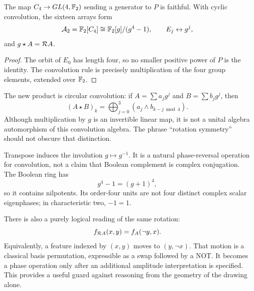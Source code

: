 \begin{proposition}
The map $C_4\to GL(4,\mathbb F_2)$ sending a generator to $P$ is faithful. With cyclic convolution, the sixteen arrays form
\begin{equation}
 \mathcal A_2=\mathbb F_2[C_4]\cong\mathbb F_2[g]/(g^4-1),\qquad E_j\leftrightarrow g^j,
\end{equation}
and $g\star A=\mathcal R A$.
\end{proposition}
\begin{proof}
The orbit of $E_0$ has length four, so no smaller positive power of $P$ is the identity. The convolution rule is precisely multiplication of the four group elements, extended over $\mathbb F_2$.
\end{proof}
The new product is circular convolution: if $A=\sum a_jg^j$ and $B=\sum b_jg^j$, then
\begin{equation}
 (A\star B)_k=\bigoplus_{j=0}^3(a_j\land b_{k-j\bmod4}).
\end{equation}
Although multiplication by $g$ is an invertible linear map, it is not a unital algebra automorphism of this convolution algebra. The phrase ``rotation symmetry'' should not obscure that distinction.

Transpose induces the involution $g\mapsto g^{-1}$. It is a natural phase-reversal operation for convolution, not a claim that Boolean complement is complex conjugation. The Boolean ring has
\begin{equation}\label{eq:nilpotent}
 g^4-1=(g+1)^4,
\end{equation}
so it contains nilpotents. Its order-four units are not four distinct complex scalar eigenphases; in characteristic two, $-1=1$.

There is also a purely logical reading of the same rotation:
\begin{equation}
 f_{\mathcal R A}(x,y)=f_A(\neg y,x).
\end{equation}
Equivalently, a feature indexed by $(x,y)$ moves to $(y,\neg x)$. That motion is a classical basis permutation, expressible as a swap followed by a NOT. It becomes a phase operation only after an additional amplitude interpretation is specified. This provides a useful guard against reasoning from the geometry of the drawing alone.
